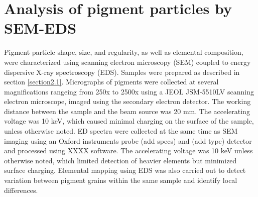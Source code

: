 \section[Analysis of pigment particles by SEM-EDS]{Analysis of pigment particles by SEM-EDS}
\label{section2.3}

Pigment particle shape, size, and regularity, as well as elemental composition, were characterized using scanning electron microscopy (SEM) coupled to energy dispersive X-ray spectroscopy (EDS). Samples were prepared as described in section \ref{section2.1}. Micrographs of pigments were collected at several magnifications rangeing from 250x to 2500x using a JEOL JSM-5510LV scanning electron microscope, imaged using the secondary electron detector. The working distance between the sample and the beam source was 20 mm. The accelerating voltage was 10 keV, which caused minimal charging on the surface of the sample, unless otherwise noted. ED spectra were collected at the same time as SEM imaging using an Oxford instruments probe (add specs) and (add type) detector and processed using XXXX software. The accelerating voltage was 10 keV unless otherwise noted, which limited detection of heavier elements but minimized surface charging. Elemental mapping using EDS was also carried out to detect variation between pigment grains within the same sample and identify local differences. 

